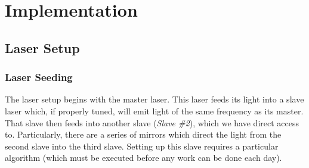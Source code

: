 \newpage
\section{Implementation}
\label{sec:implementation}

\subsection{Laser Setup}

    \subsubsection{Laser Seeding}
    
The laser setup begins with the master laser.  This laser feeds its light into a slave laser which, if properly tuned, will emit light of the same frequency as its master. \\

That slave then feeds into another slave (\emph{Slave \#2}), which we have direct access to.  Particularly, there are a series of mirrors which direct the light from the second slave into the third slave.  Setting up this slave requires a particular algorithm (which must be executed before any work can be done each day). \\

